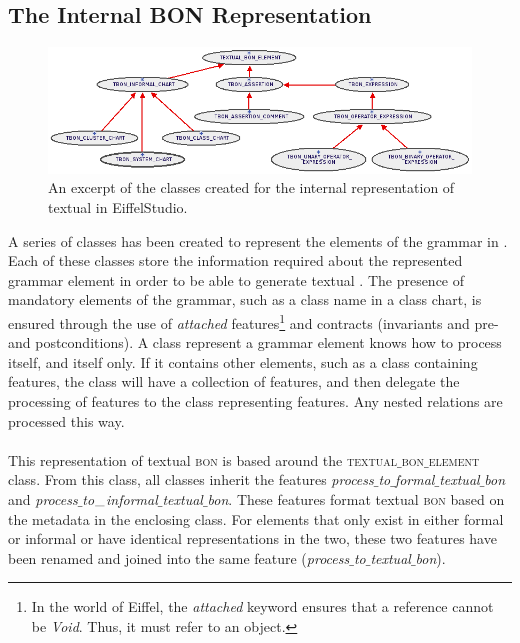 \subsection{The Internal BON Representation}
\begin{figure}[H]
\centerline{
\includegraphics[scale=0.7]{images/bon-extractor-mog-overview.png}
}
\caption{An excerpt of the classes created for the internal representation of textual \bon{} in EiffelStudio.}
\label{fig:textual_bon_formatter}
\end{figure}
A series of classes has been created to represent the elements of the \bon{} grammar in \cite{walden1995}. Each of these classes store the information required about the represented grammar element in order to be able to generate textual \bon{}. The presence of mandatory elements of the grammar, such as a class name in a class chart, is ensured through the use of  \textit{attached} features\footnote{In the world of Eiffel, the \textit{attached} keyword ensures that a reference cannot be \textit{Void}. Thus, it must refer to an object.} and contracts (invariants and pre- and postconditions). A class represent a grammar element knows how to process itself, and itself only. If it contains other elements, such as a class containing features, the class will have a collection of features, and then delegate the processing of features to the class representing features. Any nested relations are processed this way.

\paragraph{}
This representation of textual \textsc{bon} is based around the \textsc{textual$\_$bon$\_$element} class. From this class, all classes inherit the features \textit{process$\_$to$\_$formal$\_$textual$\_$bon} and  \textit{process$\_$to$\_\newline$informal$\_$textual$\_$bon}. These features format textual \textsc{bon} based on the metadata in the enclosing class. For elements that only exist in either formal or informal \bon{} or have identical representations in the two, these two features have been renamed and joined into the same feature (\textit{process$\_$to$\_$textual$\_$bon}).

